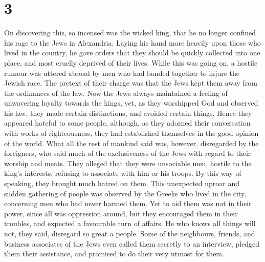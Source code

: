\hypertarget{section-2}{%
\section{3}\label{section-2}}

 On discovering this, so incensed was the wicked king, that
he no longer confined his rage to the Jews in Alexandria. Laying his
hand more heavily upon those who lived in the country, he gave orders
that they should be quickly collected into one place, and most cruelly
deprived of their lives.  While this was going on, a hostile
rumour was uttered abroad by men who had banded together to injure the
Jewish race. The pretext of their charge was that the Jews kept them
away from the ordinances of the law.  Now the Jews always
maintained a feeling of unwavering loyalty towards the kings,
 yet, as they worshipped God and observed his law, they made
certain distinctions, and avoided certain things. Hence they appeared
hateful to some people,  although, as they adorned their
conversation with works of righteousness, they had established
themselves in the good opinion of the world.  What all the
rest of mankind said was, however, disregarded by the foreigners,
 who said much of the exclusiveness of the Jews with regard
to their worship and meats. They alleged that they were unsociable men,
hostile to the king's interests, refusing to associate with him or his
troops. By this way of speaking, they brought much hatred on them.
 This unexpected uproar and sudden gathering of people was
observed by the Greeks who lived in the city, concerning men who had
never harmed them. Yet to aid them was not in their power, since all was
oppression around, but they encouraged them in their troubles, and
expected a favourable turn of affairs.  He who knows all
things will not, they said, disregard so great a people. 
Some of the neighbours, friends, and business associates of the Jews
even called them secretly to an interview, pledged them their
assistance, and promised to do their very utmost for them.


